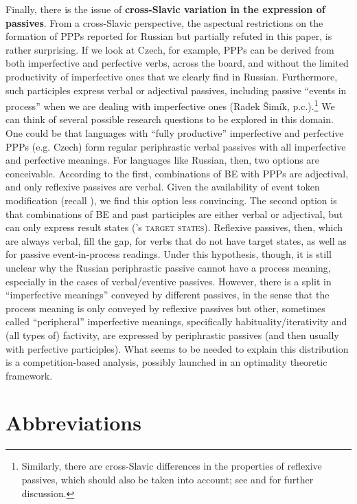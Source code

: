 \documentclass[output=paper,
modfonts,
newtxmath,
hidelinks
]{langscibook}
\begin{document}
Finally, there is the issue of \textbf{cross-Slavic variation in the expression of passives}. From a cross-Slavic perspective, the aspectual restrictions on the formation of PPPs reported for Russian but partially refuted in this paper, is rather surprising. If we look at Czech, for example, PPPs can be derived from both imperfective and perfective verbs, across the board, and without the limited productivity of imperfective ones that we clearly find in Russian. Furthermore, such participles express verbal or adjectival passives, including passive ``events in process'' when we are dealing with imperfective ones (Radek Šimík, p.c.).\footnote{Similarly, there are cross-Slavic differences in the properties of reflexive passives, which should also be taken into account; see \citet{fehrmann+10} and \citet{schaefer16} for further discussion.} We can think of several possible research questions to be explored in this domain. One could be that languages with ``fully productive'' imperfective and perfective PPPs (e.g. Czech) form regular periphrastic verbal passives with all imperfective and perfective meanings. For languages like Russian, then, two options are conceivable. According to the first, combinations of BE with PPPs are adjectival, and only reflexive passives are verbal. Given the availability of event token modification (recall ), we find this option less convincing. The second option is that combinations of BE and past participles are either verbal or adjectival, but can only express result states (\citeauthor{kratzer00}'s \citeyear{kratzer00} \textsc{target states}). Reflexive passives, then, which are always verbal, fill the gap, for verbs that do not have target states, as well as for passive event-in-process readings. Under this hypothesis, though, it is still unclear why the Russian periphrastic passive cannot have a process meaning, especially in the cases of verbal/eventive passives. However, there is a split in ``imperfective meanings'' conveyed by different passives, in the sense that the process meaning is only conveyed by reflexive passives but other, sometimes called ``peripheral'' imperfective meanings, specifically habituality/iterativity and (all types of) factivity, are expressed by periphrastic passives (and then usually with perfective participles). What seems to be needed to explain this distribution is a competition-based analysis, possibly launched in an optimality theoretic framework. 

\section*{Abbreviations}
\end{document}
